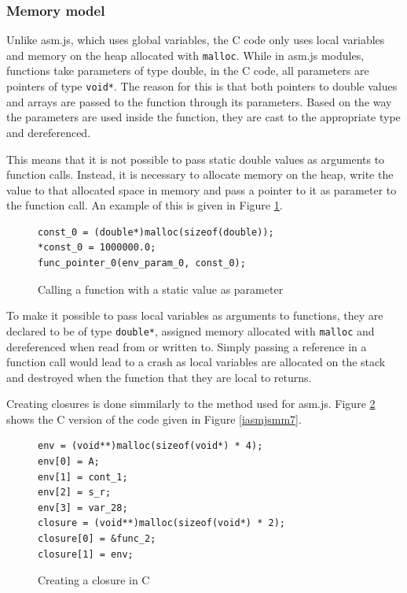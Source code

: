 \documentclass[11pt]{report}
\begin{document}
\subsubsection{Memory model}
Unlike asm.js, which uses global variables, the C code only uses local variables and memory on the heap allocated with \texttt{malloc}. While in asm.js modules, functions take parameters of type double, in the C code, all parameters are pointers of type \texttt{void*}. The reason for this is that both pointers to double values and arrays are passed to the function through its parameters. Based on the way the parameters are used inside the function, they are cast to the appropriate type and dereferenced.

This means that it is not possible to pass static double values as arguments to function calls. Instead, it is necessary to allocate memory on the heap, write the value to that allocated space in memory and pass a pointer to it as parameter to the function call. An example of this is given in Figure \ref{icmm1}.

\begin{figure}[ht]
\begin{lstlisting}
const_0 = (double*)malloc(sizeof(double));
*const_0 = 1000000.0;
func_pointer_0(env_param_0, const_0);
\end{lstlisting}
\caption{Calling a function with a static value as parameter}
\label{icmm1}
\end{figure}

To make it possible to pass local variables as arguments to functions, they are declared to be of type \texttt{double*}, assigned memory allocated with \texttt{malloc} and dereferenced when read from or written to. Simply passing a reference in a function call would lead to a crash as local variables are allocated on the stack and destroyed when the function that they are local to returns.

Creating closures is done simmilarly to the method used for asm.js. Figure \ref{icmm2} shows the C version of the code given in Figure \ref{iasmjsmm7}.

\begin{figure}[ht]
\begin{lstlisting}
env = (void**)malloc(sizeof(void*) * 4);
env[0] = A;
env[1] = cont_1;
env[2] = s_r;
env[3] = var_28;
closure = (void**)malloc(sizeof(void*) * 2);
closure[0] = &func_2;
closure[1] = env;
\end{lstlisting}
\caption{Creating a closure in C}
\label{icmm2}
\end{figure}
\end{document}
